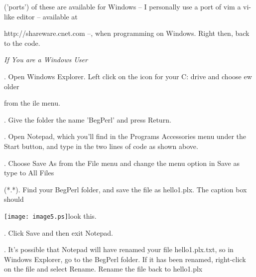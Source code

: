 \documentclass[a4paper,11pt]{book}
\begin{document}
\noindent ('ports') of these are available for Windows -- I personally use a port of vim a vi-like editor -- available at

\noindent http://shareware.cnet.com --, when programming on Windows. Right then, back to the code.

\noindent \textit{If You are a Windows User}

.   Open Windows Explorer. Left click on the icon for your C: drive and choose ew \textbar  {}older

\noindent from the ile menu.

\noindent 

.   Give the folder the name 'BegPerl' and press Return.

\noindent 

.   Open Notepad, which you'll find in the Programs \textbar  Accessories menu under the Start button, and type in the two lines of code as shown above.

\noindent 

.   Choose Save As from the File menu and change the menu option in Save as type to All Files

\noindent (*.*). Find your BegPerl folder, and save the file as hello1.plx. The caption box should

\noindent \texttt{[image: image5.ps]}look this.

\noindent 

\noindent 

\noindent 

\noindent 

\noindent 

\noindent 

\noindent 

\noindent 

\noindent 

\noindent 

\noindent 

\noindent 

\noindent 

\noindent 

\noindent 

.   Click Save and then exit Notepad.

\noindent 

.   It's possible that Notepad will have renamed your file hello1.plx.txt, so in Windows Explorer, go to the BegPerl folder. If it has been renamed, right-click on the file and select Rename. Rename the file back to hello1.plx
\end{document}
